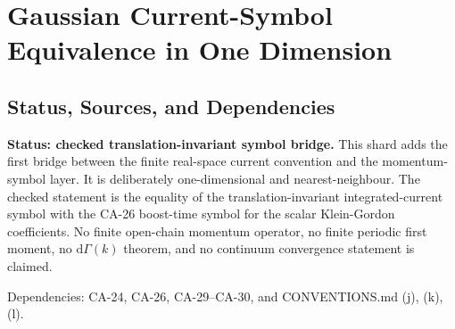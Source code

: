 
\section{Gaussian Current-Symbol Equivalence in One Dimension}
\label{sec:gaussian-current-symbol-equivalence}

\subsection{Status, Sources, and Dependencies}

\textbf{Status: checked translation-invariant symbol bridge.}  This shard adds
the first bridge between the finite real-space current convention and the
momentum-symbol layer.  It is deliberately one-dimensional and
nearest-neighbour.  The checked statement is the equality of the
translation-invariant integrated-current symbol with the CA-26 boost-time
symbol for the scalar Klein-Gordon coefficients.  No finite open-chain momentum
operator, no finite periodic first moment, no \(\mathrm d\Gamma(k)\) theorem,
and no continuum convergence statement is claimed.

Dependencies: CA-24, CA-26, CA-29--CA-30, and CONVENTIONS.md (j), (k), (l).


